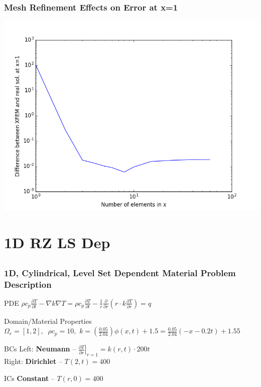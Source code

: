 \documentclass[]{beamer}
\begin{document}
\begin{frame}[t]\frametitle{Mesh Refinement Effects on Error at x=1}
	\begin{center}
		\includegraphics[scale=0.4]{figures/1D_rz_h1m/1D_rz_homog1mat_neumann_comp}
	\end{center}
\end{frame}

\section{1D RZ LS Dep}
\subsection{}
\begin{frame}[t]\frametitle{1D, Cylindrical, Level Set Dependent Material Problem Description}
  \begin{block}{PDE}
    $\rho c_p\frac{\partial T}{\partial t} - \nabla k \nabla T = \rho c_p\frac{\partial T}{\partial t} - \frac{1}{r} \frac{\partial}{\partial r}\left(r\cdot k \frac{\partial T}{\partial r} \right) = q$
  \end{block}
  
  \begin{block}{Domain/Material Properties}
  	$\Omega_r = [1,2], \,\,\ \rho c_p = 10, \,\, k=\left(\frac{0.05}{2.04}\right) \phi(x,t) + 1.5
  	= \frac{0.05}{2.04}\left( - x - 0.2t\right) + 1.55$
  \end{block}
  
  \begin{block}{BCs}
    Left:  \textbf{Neumann} -- $\left. \frac{\partial T}{\partial r}\right|_{r=1} = k(r,t) \cdot 200t$ \\
    Right: \textbf{Dirichlet} -- $T(2,t) = 400$
  \end{block}
  
  \begin{block}{ICs}
    \textbf{Constant} -- $T(r,0) = 400$
  \end{block}
\end{frame}
\end{document}
